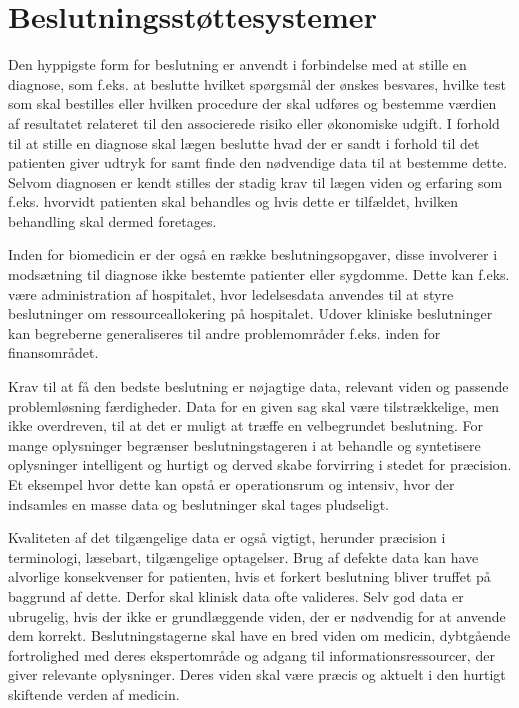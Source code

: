 \chapter{Beslutningsstøttesystemer}
Den hyppigste form for beslutning er anvendt i forbindelse med at stille en diagnose, som f.eks. at beslutte hvilket spørgsmål der ønskes besvares, hvilke test som skal bestilles eller hvilken procedure der skal udføres og bestemme værdien af resultatet relateret til den associerede risiko eller økonomiske udgift. I forhold til at stille en diagnose skal lægen beslutte hvad der er sandt i forhold til det patienten giver udtryk for samt finde den nødvendige data til at bestemme dette. Selvom diagnosen er kendt stilles der stadig krav til lægen viden og erfaring som f.eks. hvorvidt patienten skal behandles og hvis dette er tilfældet, hvilken behandling skal dermed foretages.

Inden for biomedicin er der også en række beslutningsopgaver, disse involverer i modsætning til diagnose ikke bestemte patienter eller sygdomme. Dette kan f.eks. være administration af hospitalet, hvor ledelsesdata anvendes til at styre beslutninger om ressourceallokering på hospitalet. Udover kliniske beslutninger kan begreberne generaliseres til andre problemområder f.eks. inden for finansområdet. 

Krav til at få den bedste beslutning er nøjagtige data, relevant viden og passende problemløsning færdigheder. Data for en given sag skal være tilstrækkelige, men ikke overdreven, til at det er muligt at træffe en velbegrundet beslutning. For mange oplysninger begrænser beslutningstageren i at behandle og syntetisere oplysninger intelligent og hurtigt og derved skabe forvirring i stedet for præcision. Et eksempel hvor dette kan opstå er operationsrum og intensiv, hvor der indsamles en masse data og beslutninger skal tages pludseligt. 

Kvaliteten af det tilgængelige data er også vigtigt, herunder præcision i terminologi, læsebart, tilgængelige optagelser. Brug af defekte data kan have alvorlige konsekvenser for patienten, hvis et forkert beslutning bliver truffet på baggrund af dette. Derfor skal klinisk data ofte valideres. Selv god data er ubrugelig, hvis der ikke er grundlæggende viden, der er nødvendig for at anvende dem korrekt. Beslutningstagerne skal have en bred viden om medicin, dybtgående fortrolighed med deres ekspertområde  og adgang til informationsressourcer, der giver relevante oplysninger. Deres viden skal være præcis og aktuelt i den hurtigt skiftende verden af medicin.

